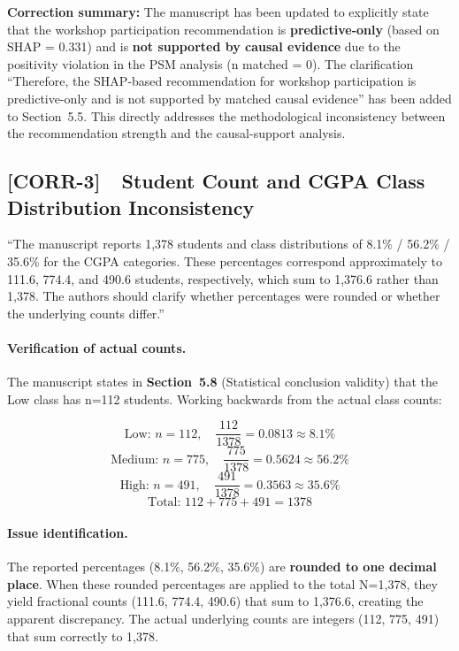 \documentclass[11pt,a4paper]{article}
\newcommand{\cid}[1]{\textcolor{revred}{\textbf{[#1]}}}
\newcommand{\sectref}[1]{Section~#1}
\newcommand{\stress}[1]{\textbf{#1}}
\begin{document}
\begin{correctionbox}
\noindent \textbf{Correction summary:} The manuscript has been updated to explicitly state that the workshop participation recommendation is \stress{predictive-only} (based on SHAP = 0.331) and is \stress{not supported by causal evidence} due to the positivity violation in the PSM analysis (n matched = 0). The clarification ``Therefore, the SHAP-based recommendation for workshop participation is predictive-only and is not supported by matched causal evidence'' has been added to \sectref{5.5}. This directly addresses the methodological inconsistency between the recommendation strength and the causal-support analysis.
\end{correctionbox}


\subsection*{\cid{CORR-3}~~Student Count and CGPA Class Distribution Inconsistency}

\begin{reviewerquote}
``The manuscript reports 1,378 students and class distributions of 8.1\% / 56.2\% / 35.6\% for the CGPA categories. These percentages correspond approximately to 111.6, 774.4, and 490.6 students, respectively, which sum to 1,376.6 rather than 1,378. The authors should clarify whether percentages were rounded or whether the underlying counts differ.''
\end{reviewerquote}

\paragraph{Verification of actual counts.} The manuscript states in \stress{\sectref{5.8}} (Statistical conclusion validity) that the Low class has n=112 students. Working backwards from the actual class counts:

\[
\text{Low: } n = 112, \quad \frac{112}{1378} = 0.0813 \approx 8.1\%
\]
\[
\text{Medium: } n = 775, \quad \frac{775}{1378} = 0.5624 \approx 56.2\%
\]
\[
\text{High: } n = 491, \quad \frac{491}{1378} = 0.3563 \approx 35.6\%
\]
\[
\text{Total: } 112 + 775 + 491 = 1378
\]

\paragraph{Issue identification.} The reported percentages (8.1\%, 56.2\%, 35.6\%) are \stress{rounded to one decimal place}. When these rounded percentages are applied to the total N=1,378, they yield fractional counts (111.6, 774.4, 490.6) that sum to 1,376.6, creating the apparent discrepancy. The actual underlying counts are integers (112, 775, 491) that sum correctly to 1,378.
\end{document}
